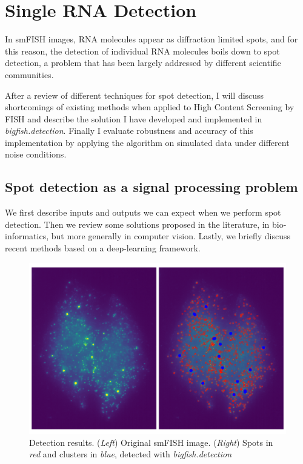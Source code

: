 
\graphicspath{{./figures/chapter2/}}


\chapter{Single RNA Detection}
\label{ch:chapter2}

\minitoc
\newpage


In smFISH images, RNA molecules appear as diffraction limited spots, and for this reason, the detection of individual RNA molecules boils down to spot detection, a problem that has been largely addressed by different scientific communities. 

After a review of different techniques for spot detection, I will discuss shortcomings of existing methods when applied to High Content Screening by \ac{FISH} and describe the solution I have developed and implemented in \mbox{\emph{bigfish.detection}}.
Finally I evaluate robustness and accuracy of this implementation by applying the algorithm on simulated data under different noise conditions.

\section{Spot detection as a signal processing problem}
\label{sec:detection_introduction}


We first describe inputs and outputs we can expect when we perform spot detection.
Then we review some solutions proposed in the literature, in bio-informatics, but more generally in computer vision.
Lastly, we briefly discuss recent methods based on a deep-learning framework.

\begin{figure}[h]
    \centering
    \includegraphics[width=1\textwidth]{figures/chapter2/cluster_detection_results}
	\caption{Detection results.
	(\textit{Left}) Original smFISH image.
	(\textit{Right}) Spots in \textit{red} and clusters in \textit{blue}, detected with \emph{bigfish.detection}}
    \label{fig:detection_results}
\end{figure}

